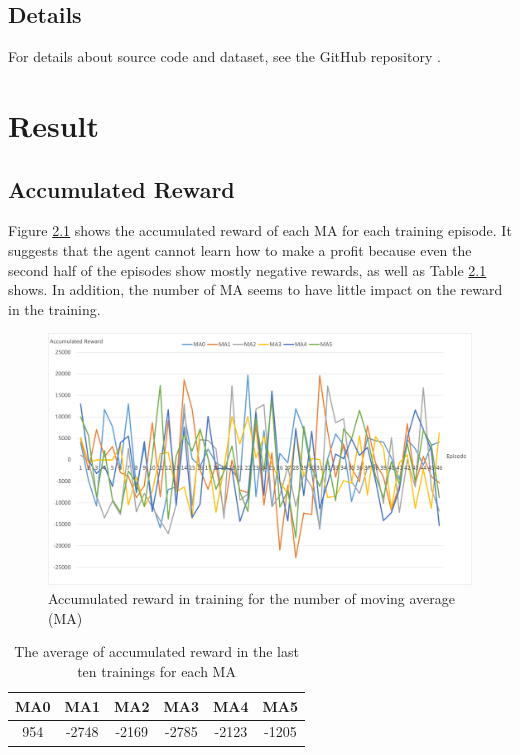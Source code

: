 \section{Details}
For details about source code and dataset, see the GitHub repository \cite{src}.

\chapter{Result}
\label{sec:result}
\section{Accumulated Reward}
Figure \ref{fig:acRewardTrain} shows the accumulated reward of each MA for each training episode. It suggests that the agent cannot learn how to make a profit because even the second half of the episodes show mostly negative rewards, as well as Table \ref{tb:acRewardTrain10} shows. In addition, the number of MA seems to have little impact on the reward in the training.


\begin{figure}[htbp]
  \centering
  \includegraphics[scale=0.5]{./Figure/acRewardTrain.png}
  \caption{Accumulated reward in training for the number of moving average (MA)}
  \label{fig:acRewardTrain}
\end{figure}

\begin{table}[htb]
  \centering
  \caption{The average of accumulated reward in the last ten trainings for each MA}
  \label{tb:acRewardTrain10}
  \begin{tabular}{|c|c|c|c|c|c|}
  \hline
    MA0  & MA1   & MA2    & MA3   & MA4    & MA5   \\
  \hline
    954  & -2748 & -2169  & -2785 & -2123  & -1205 \\
  \hline
  \end{tabular}
\end{table}

